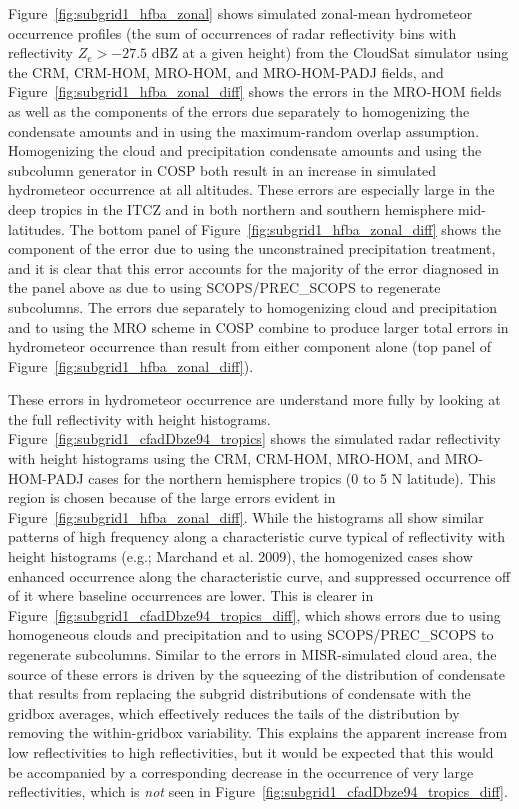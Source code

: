 Figure~\ref{fig:subgrid1_hfba_zonal} shows simulated zonal-mean
hydrometeor occurrence profiles (the sum of occurrences of radar
reflectivity bins with reflectivity \(Z_e > -27.5\) dBZ at a given
height) from the CloudSat simulator using the CRM, CRM-HOM, MRO-HOM, and
MRO-HOM-PADJ fields, and Figure~\ref{fig:subgrid1_hfba_zonal_diff} shows
the errors in the MRO-HOM fields as well as the components of the errors
due separately to homogenizing the condensate amounts and in using the
maximum-random overlap assumption. Homogenizing the cloud and
precipitation condensate amounts and using the subcolumn generator in
COSP both result in an increase in simulated hydrometeor occurrence at
all altitudes. These errors are especially large in the deep tropics in
the ITCZ and in both northern and southern hemisphere mid-latitudes. The
bottom panel of Figure~\ref{fig:subgrid1_hfba_zonal_diff} shows the
component of the error due to using the unconstrained precipitation
treatment, and it is clear that this error accounts for the majority of
the error diagnosed in the panel above as due to using SCOPS/PREC\_SCOPS
to regenerate subcolumns. The errors due separately to homogenizing
cloud and precipitation and to using the MRO scheme in COSP combine to
produce larger total errors in hydrometeor occurrence than result from
either component alone (top panel of
Figure~\ref{fig:subgrid1_hfba_zonal_diff}).

These errors in hydrometeor occurrence are understand more fully by
looking at the full reflectivity with height histograms.
Figure~\ref{fig:subgrid1_cfadDbze94_tropics} shows the simulated radar
reflectivity with height histograms using the CRM, CRM-HOM, MRO-HOM, and
MRO-HOM-PADJ cases for the northern hemisphere tropics (0 to 5 N
latitude). This region is chosen because of the large errors evident in
Figure~\ref{fig:subgrid1_hfba_zonal_diff}. While the histograms all show
similar patterns of high frequency along a characteristic curve typical
of reflectivity with height histograms (e.g.; Marchand et al. 2009), the
homogenized cases show enhanced occurrence along the characteristic
curve, and suppressed occurrence off of it where baseline occurrences
are lower. This is clearer in
Figure~\ref{fig:subgrid1_cfadDbze94_tropics_diff}, which shows errors
due to using homogeneous clouds and precipitation and to using
SCOPS/PREC\_SCOPS to regenerate subcolumns. Similar to the errors in
MISR-simulated cloud area, the source of these errors is driven by the
squeezing of the distribution of condensate that results from replacing
the subgrid distributions of condensate with the gridbox averages, which
effectively reduces the tails of the distribution by removing the
within-gridbox variability. This explains the apparent increase from low
reflectivities to high reflectivities, but it would be expected that
this would be accompanied by a corresponding decrease in the occurrence
of very large reflectivities, which is \emph{not} seen in
Figure~\ref{fig:subgrid1_cfadDbze94_tropics_diff}.

